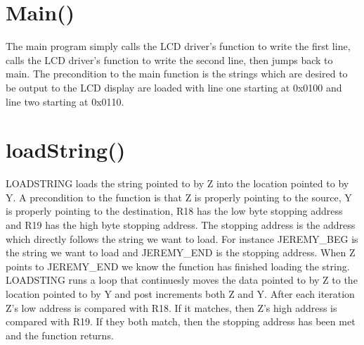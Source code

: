 \documentclass[12pt,letterpaper]{article}
\begin{document}
\section{Main()}
	The main program simply calls the LCD driver's function to write the first line, calls the LCD driver's function to write the second line, then jumps back to main.
	The precondition to the main function is the strings which are desired to be output to the LCD display are loaded with line one starting at 0x0100 and line two starting at 0x0110.

\section{loadString()}
	LOADSTRING loads the string pointed to by Z into the location pointed to by Y.
	A precondition to the function is that Z is properly pointing to the source, Y is properly pointing to the destination, R18 has the low byte stopping address and R19 has the high byte stopping address.
	The stopping address is the address which directly follows the string we want to load.
	For instance JEREMY\_BEG is the string we want to load and JEREMY\_END is the stopping address.
	When Z points to JEREMY\_END we know the function has finished loading the string.
	LOADSTING runs a loop that continuesly moves the data pointed to by Z to the location pointed to by Y and post increments both Z and Y.
	After each iteration Z's low address is compared with R18.
	If it matches, then Z's high address is compared with R19.
	If they both match, then the stopping address has been met and the function returns.
\end{document}
